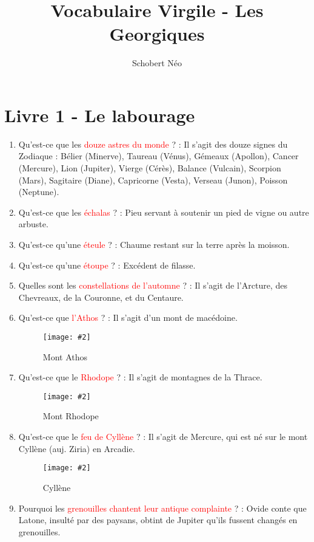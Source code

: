 \documentclass[a4paper, 11pt, hidelinks]{article}
\newcommand{\img}[4]{\begin{figure}[!ht]
    \centering
    \texttt{[image: \#2]}
    \caption{#3}
    \label{#4}
    \end{figure} }
\begin{document}
\newcommand{\grad}[1]{\vv{grad}#1}


\title{Vocabulaire Virgile - Les Georgiques}
\author{Schobert Néo}

\maketitle

\tableofcontents


\newpage



\section{Livre 1 - Le labourage}

\begin{enumerate}
    \item Qu'est-ce que les \textcolor{red}{douze astres du monde} ? : Il s'agit des douze signes du Zodiaque : Bélier (Minerve), Taureau (Vénus), Gémeaux (Apollon),
          Cancer (Mercure), Lion (Jupiter), Vierge (Cérès), Balance (Vulcain), Scorpion (Mars), Sagitaire (Diane), Capricorne (Vesta), Verseau (Junon), Poisson (Neptune).
    \item Qu'est-ce que les \textcolor{red}{échalas} ? : Pieu servant à soutenir un pied de vigne ou autre arbuste.
    \item Qu'est-ce qu'une \textcolor{red}{éteule} ? : Chaume restant sur la terre après la moisson.
    \item Qu'est-ce qu'une \textcolor{red}{étoupe} ? : Excédent de filasse.
    \item Quelles sont les \textcolor{red}{constellations de l'automne} ? : Il s'agit de l'Arcture, des Chevreaux, de la Couronne, et du Centaure.
    \item Qu'est-ce que \textcolor{red}{l'Athos} ? : Il s'agit d'un mont de macédoine.
          \img{0.35}{Athos.png}{Mont Athos}{40}
    \item Qu'est-ce que le \textcolor{red}{Rhodope} ? : Il s'agit de montagnes de la Thrace.
          \img{0.4}{Rhodope.png}{Mont Rhodope}{41}
    \item Qu'est-ce que le \textcolor{red}{feu de Cyllène} ? : Il s'agit de Mercure, qui est né sur le mont Cyllène (auj. Ziria) en Arcadie.
          \img{0.3}{Cyllène.png}{Cyllène}{43}
    \item Pourquoi les \textcolor{red}{grenouilles chantent leur antique complainte} ? : Ovide conte que Latone, insulté par des paysans, obtint de Jupiter
          qu'ils fussent changés en grenouilles.

\end{enumerate}
\end{document}
